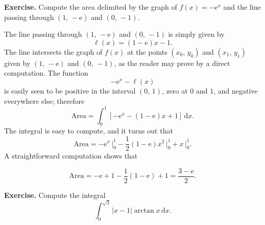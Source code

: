 \documentclass[a4paper,10 pt]{report}
\newcommand{\finalanswer}[1]{%
    \begin{finalAnswer}
    \[
        #1
    \]
    \end{finalAnswer}
}
\theoremstyle{definition}
\begin{document}
\begin{exerciseBox} \textbf{Exercise.} Compute the area delimited by the graph of $f(x) = - \mathrm{e}^x$ and the line passing through $(1, \, - \mathrm{e})$ and $(0, \, - 1)$.
\end{exerciseBox}

\begin{solutionBox} The line passing through $(1, \, - \mathrm{e})$ and $(0, \, -1)$ is simply given by
\begin{equation*}\ell(x) = (1 - \mathrm{e})x - 1. \end{equation*}
The line intersects the graph of $f(x)$ at the points $(x_0, \, y_0)$ and $(x_1, \, y_1)$ given by $(1, \, - \mathrm{e})$ and $(0, \, -1)$, as the reader may prove by a direct computation. The function
\begin{equation*}- \mathrm{e}^x - \ell(x) \end{equation*}
is easily seen to be positive in the interval $(0, \, 1)$, zero at $0$ and $1$, and negative everywhere else; therefore
\begin{equation*} \mathrm{Area} = \int_0^1 \left[- \mathrm{e}^x - (1 - \mathrm{e})x + 1 \right] \, \mathrm{d}x. \end{equation*}
The integral is easy to compute, and it turns out that
\begin{equation*} \mathrm{Area} = - \mathrm{e}^x \, \big|_0^1 - \frac{1}{2} (1 - \mathrm{e})x^2 \, \big|_0^1 + x \, \big|_0^1. \end{equation*}
A straightforward computation shows that
\finalanswer{
\mathrm{Area} = - \mathrm{e} + 1 - \frac{1}{2}(1 - \mathrm{e}) + 1 = \frac{3 - \mathrm{e}}{2}.
}\end{solutionBox}

\begin{exerciseBox} \textbf{Exercise.} Compute the integral
\begin{equation*} \int_0^{\sqrt{3}} |x - 1| \arctan x \, \mathrm{d}x.\end{equation*}
\end{exerciseBox}
\end{document}
